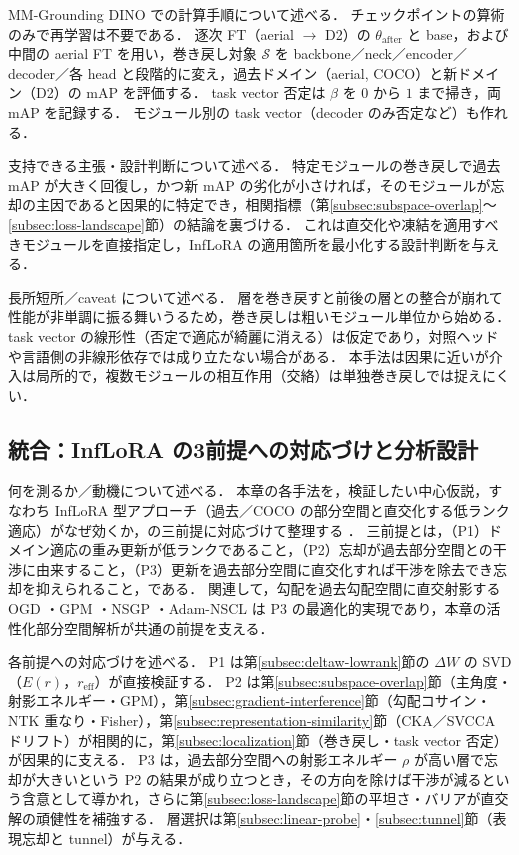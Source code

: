 MM-Grounding DINO での計算手順について述べる．
チェックポイントの算術のみで再学習は不要である．
逐次 FT（aerial $\rightarrow$ D2）の $\theta_{\mathrm{after}}$ と base，および中間の aerial FT を用い，巻き戻し対象 $\mathcal{S}$ を backbone／neck／encoder／decoder／各 head と段階的に変え，過去ドメイン（aerial, COCO）と新ドメイン（D2）の mAP を評価する．
task vector 否定は $\beta$ を $0$ から $1$ まで掃き，両 mAP を記録する．
モジュール別の task vector（decoder のみ否定など）も作れる．

支持できる主張・設計判断について述べる．
特定モジュールの巻き戻しで過去 mAP が大きく回復し，かつ新 mAP の劣化が小さければ，そのモジュールが忘却の主因であると因果的に特定でき，相関指標（第\ref{subsec:subspace-overlap}〜\ref{subsec:loss-landscape}節）の結論を裏づける．
これは直交化や凍結を適用すべきモジュールを直接指定し，InfLoRA の適用箇所を最小化する設計判断を与える．

長所短所／caveat について述べる．
層を巻き戻すと前後の層との整合が崩れて性能が非単調に振る舞いうるため，巻き戻しは粗いモジュール単位から始める．
task vector の線形性（否定で適応が綺麗に消える）は仮定であり，対照ヘッドや言語側の非線形依存では成り立たない場合がある．
本手法は因果に近いが介入は局所的で，複数モジュールの相互作用（交絡）は単独巻き戻しでは捉えにくい．


\subsection{統合：InfLoRA の3前提への対応づけと分析設計}
\label{subsec:integrated-design}

何を測るか／動機について述べる．
本章の各手法を，検証したい中心仮説，すなわち InfLoRA 型アプローチ（過去／COCO の部分空間と直交化する低ランク適応）がなぜ効くか，の三前提に対応づけて整理する \cite{inflora}．
三前提とは，（P1）ドメイン適応の重み更新が低ランクであること，（P2）忘却が過去部分空間との干渉に由来すること，（P3）更新を過去部分空間に直交化すれば干渉を除去でき忘却を抑えられること，である．
関連して，勾配を過去勾配空間に直交射影する OGD \cite{ogd}・GPM \cite{gpm}・NSGP \cite{nsgp}・Adam-NSCL \cite{adamnscl} は P3 の最適化的実現であり，本章の活性化部分空間解析が共通の前提を支える．

各前提への対応づけを述べる．
P1 は第\ref{subsec:deltaw-lowrank}節の $\Delta W$ の SVD（$E(r)$，$r_{\mathrm{eff}}$）が直接検証する．
P2 は第\ref{subsec:subspace-overlap}節（主角度・射影エネルギー・GPM），第\ref{subsec:gradient-interference}節（勾配コサイン・NTK 重なり・Fisher），第\ref{subsec:representation-similarity}節（CKA／SVCCA ドリフト）が相関的に，第\ref{subsec:localization}節（巻き戻し・task vector 否定）が因果的に支える．
P3 は，過去部分空間への射影エネルギー $\rho$ が高い層で忘却が大きいという P2 の結果が成り立つとき，その方向を除けば干渉が減るという含意として導かれ，さらに第\ref{subsec:loss-landscape}節の平坦さ・バリアが直交解の頑健性を補強する．
層選択は第\ref{subsec:linear-probe}・\ref{subsec:tunnel}節（表現忘却と tunnel）が与える．

